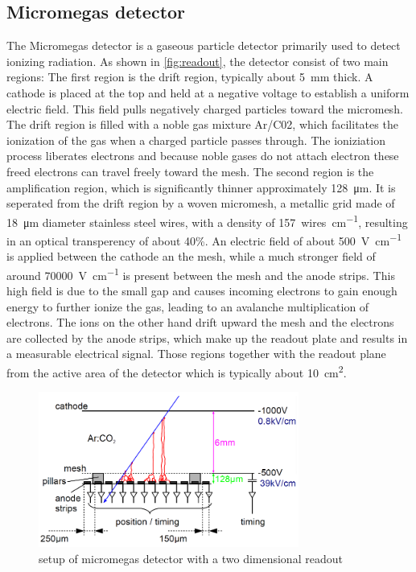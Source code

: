 \documentclass[sn-mathphys-num,iicol]{sn-jnl}
\theoremstyle{thmstyleone}
\theoremstyle{thmstyletwo}
\theoremstyle{thmstylethree}
\begin{document}
\subsection{Micromegas detector}
The Micromegas detector is a gaseous particle detector primarily used to detect ionizing radiation. As shown in \autoref{fig:readout}, the detector consist of two main regions: 
The first region is the drift region, typically about \SI{5}{\milli\meter} thick.
A cathode is placed at the top and held at a negative voltage to establish a uniform electric field.
This field pulls negatively charged particles toward the micromesh. The drift region is filled with a noble gas mixture Ar/C02, which facilitates the ionization of the gas when a charged particle passes through. The ioniziation process liberates electrons and because noble gases do not attach electron these freed electrons can travel freely toward the mesh. The second region is the amplification region, which is significantly thinner approximately \SI{128}{\micro\meter}. It is seperated from the drift region by a woven micromesh, a metallic grid made of \SI{18}{\micro\meter} diameter stainless steel wires, with a density of \SI{157}{wires\per\cm}, resulting in an optical transperency of about 40\%.
An electric field of about \SI{500}{\volt\per\centi\meter} is applied between the cathode an the mesh, while a much stronger field of around \SI{70000}{\volt\per\centi\meter} is present between the mesh and the anode strips. This high field is due to the small gap and causes incoming electrons to gain enough energy to further ionize the gas, leading to an avalanche multiplication of electrons. The ions on the other hand drift upward the mesh and the electrons are collected by the anode strips, which make up the readout plate and results in a measurable electrical signal. Those regions together with the readout plane from the active area of the detector which is typically about \SI{10}{\centi\meter^2}.
\begin{figure}
  \includegraphics[width=\linewidth]{figures/detector_readout.png}
  \caption{setup of micromegas detector with a two dimensional readout}
  \label{fig:readout}
\end{figure}
\end{document}
